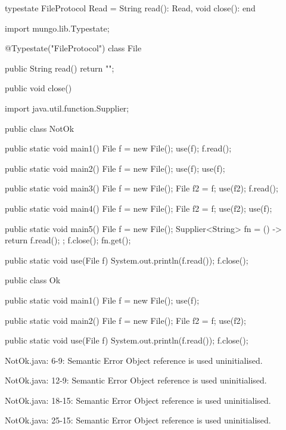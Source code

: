 \begin{code}
typestate FileProtocol {
  Read = {
    String read(): Read,
    void close(): end
  }
}\end{code}

\begin{code}
import mungo.lib.Typestate;

@Typestate("FileProtocol")
class File {

  public String read() {
    return "";
  }

  public void close() {
  }

}\end{code}

\begin{code}
import java.util.function.Supplier;

public class NotOk {
  public static void main1() {
    File f = new File();
    use(f);
    f.read();
  }

  public static void main2() {
    File f = new File();
    use(f);
    use(f);
  }

  public static void main3() {
    File f = new File();
    File f2 = f;
    use(f2);
    f.read();
  }

  public static void main4() {
    File f = new File();
    File f2 = f;
    use(f2);
    use(f);
  }

  public static void main5() {
    File f = new File();
    Supplier<String> fn = () -> {
      return f.read();
    };
    f.close();
    fn.get();
  }

  public static void use(File f) {
    System.out.println(f.read());
    f.close();
  }
}\end{code}

\begin{code}
public class Ok {
  public static void main1() {
    File f = new File();
    use(f);
  }

  public static void main2() {
    File f = new File();
    File f2 = f;
    use(f2);
  }

  public static void use(File f) {
    System.out.println(f.read());
    f.close();
  }
}\end{code}

\lstset{language=,caption=Mungo's output}
\begin{code}

NotOk.java: 6-9: Semantic Error
		Object reference is used uninitialised.

NotOk.java: 12-9: Semantic Error
		Object reference is used uninitialised.

NotOk.java: 18-15: Semantic Error
		Object reference is used uninitialised.

NotOk.java: 25-15: Semantic Error
		Object reference is used uninitialised.
\end{code}

